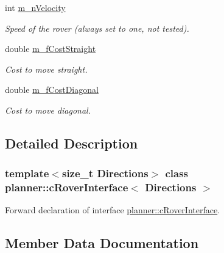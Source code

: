 \begin{DoxyCompactItemize}
int \mbox{\hyperlink{classplanner_1_1c_rover_interface_a458f3e469a13cfc909e957678ddee753}{m\+\_\+n\+Velocity}}
\begin{DoxyCompactList}\small\item\em Speed of the rover (always set to one, not tested). \end{DoxyCompactList}\item 
\mbox{\label{classplanner_1_1c_rover_interface_ad94337c2b05eed20423c1a2dcaa680cc}} 
double \mbox{\hyperlink{classplanner_1_1c_rover_interface_ad94337c2b05eed20423c1a2dcaa680cc}{m\+\_\+f\+Cost\+Straight}}
\begin{DoxyCompactList}\small\item\em Cost to move straight. \end{DoxyCompactList}\item 
\mbox{\label{classplanner_1_1c_rover_interface_afcc4b7ec327b8d2ddcdb163c7a8397b3}} 
double \mbox{\hyperlink{classplanner_1_1c_rover_interface_afcc4b7ec327b8d2ddcdb163c7a8397b3}{m\+\_\+f\+Cost\+Diagonal}}
\begin{DoxyCompactList}\small\item\em Cost to move diagonal. \end{DoxyCompactList}\end{DoxyCompactItemize}


\subsection{Detailed Description}
\subsubsection*{template$<$size\+\_\+t Directions$>$\newline
class planner\+::c\+Rover\+Interface$<$ Directions $>$}

Forward declaration of interface \mbox{\hyperlink{classplanner_1_1c_rover_interface}{planner\+::c\+Rover\+Interface}}. 

\subsection{Member Data Documentation}
\mbox{\label{classplanner_1_1c_rover_interface_a22d4f0d40dd064d62ed75da9728601ea}} 
